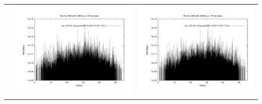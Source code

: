 \documentclass[a4paper,11pt,fleqn,oneside]{book}
\begin{document}
\begin{itemize}
\begin{table}[p]
\begin{tabular}{l|c|c}
 & \includegraphics[scale=0.25]{r256/h70/red_st14_log1/plot_mvir_out_197.pdf} & \includegraphics[scale=0.25]{r256/h100/red_st14_log1/plot_mvir_out_197.pdf} \\

\end{tabular}
\end{table}
\end{itemize}
\end{document}
